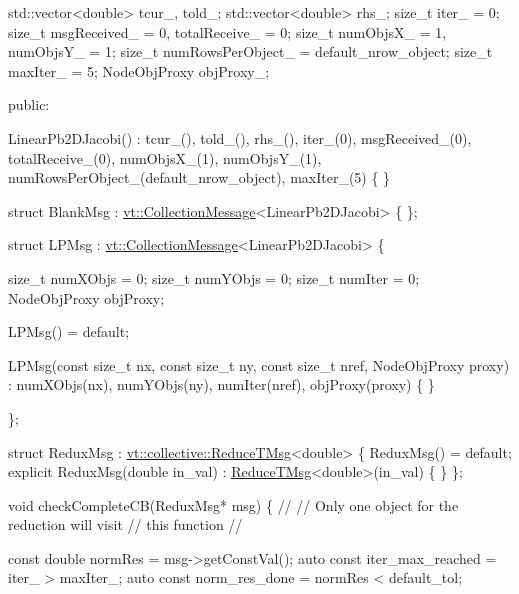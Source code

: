 \begin{DoxyCodeInclude}
  std::vector<double> tcur\_, told\_;
  std::vector<double> rhs\_;
  \textcolor{keywordtype}{size\_t} iter\_ = 0;
  \textcolor{keywordtype}{size\_t} msgReceived\_ = 0, totalReceive\_ = 0;
  \textcolor{keywordtype}{size\_t} numObjsX\_ = 1, numObjsY\_ = 1;
  \textcolor{keywordtype}{size\_t} numRowsPerObject\_ = default\_nrow\_object;
  \textcolor{keywordtype}{size\_t} maxIter\_ = 5;
  NodeObjProxy objProxy\_;

\textcolor{keyword}{public}:

  LinearPb2DJacobi()
    : tcur\_(), told\_(), rhs\_(), iter\_(0),
      msgReceived\_(0), totalReceive\_(0),
      numObjsX\_(1), numObjsY\_(1),
      numRowsPerObject\_(default\_nrow\_object),
      maxIter\_(5)
  \{ \}


  \textcolor{keyword}{struct }BlankMsg : \hyperlink{structvt_1_1vrt_1_1collection_1_1_collection_message}{vt::CollectionMessage}<LinearPb2DJacobi> \{ \};

  \textcolor{keyword}{struct }LPMsg : \hyperlink{structvt_1_1vrt_1_1collection_1_1_collection_message}{vt::CollectionMessage}<LinearPb2DJacobi> \{

    \textcolor{keywordtype}{size\_t} numXObjs = 0;
    \textcolor{keywordtype}{size\_t} numYObjs = 0;
    \textcolor{keywordtype}{size\_t} numIter = 0;
    NodeObjProxy objProxy;

    LPMsg() = \textcolor{keywordflow}{default};

    LPMsg(\textcolor{keyword}{const} \textcolor{keywordtype}{size\_t} nx, \textcolor{keyword}{const} \textcolor{keywordtype}{size\_t} ny, \textcolor{keyword}{const} \textcolor{keywordtype}{size\_t} nref, NodeObjProxy proxy)
      : numXObjs(nx), numYObjs(ny), numIter(nref), objProxy(proxy)
    \{ \}

  \};


  \textcolor{keyword}{struct }ReduxMsg : \hyperlink{structvt_1_1collective_1_1reduce_1_1operators_1_1_reduce_t_msg}{vt::collective::ReduceTMsg}<double> \{
    ReduxMsg() = \textcolor{keywordflow}{default};
    \textcolor{keyword}{explicit} ReduxMsg(\textcolor{keywordtype}{double} in\_val) : \hyperlink{namespacevt_1_1collective_a28b82d5d48c9bc6e4fd738fcbf9e0f62}{ReduceTMsg}<double>(in\_val) \{ \}
  \};


  \textcolor{keywordtype}{void} checkCompleteCB(ReduxMsg* msg) \{
    \textcolor{comment}{//}
    \textcolor{comment}{// Only one object for the reduction will visit}
    \textcolor{comment}{// this function}
    \textcolor{comment}{//}

    \textcolor{keyword}{const} \textcolor{keywordtype}{double} normRes = msg->getConstVal();
    \textcolor{keyword}{auto} \textcolor{keyword}{const} iter\_max\_reached = iter\_ > maxIter\_;
    \textcolor{keyword}{auto} \textcolor{keyword}{const} norm\_res\_done = normRes < default\_tol;


\end{DoxyCodeInclude}
